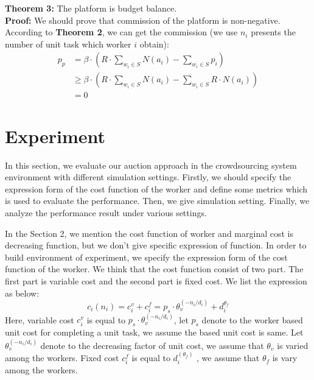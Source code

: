 \textbf{Theorem 3:} The platform is budget balance.\\
\textbf{Proof:} We should prove that commission of the platform is non-negative. According to \textbf{Theorem 2}, we can get the commission (we use $n_i$ presents the number of unit task which worker $i$ obtain):
$$
\begin{aligned}
  p_p & =    \beta \cdot \left( R \cdot \sum_{w_i \in S}N(a_i) - \sum_{w_i \in S}{p_i}\right) \\
  {}  & \geq \beta \cdot \left( R \cdot \sum_{w_i \in S}N(a_i) - \sum_{w_i \in S} R \cdot N(a_i) \right)\\
  {}  & = 0
\end{aligned}
$$
\section{Experiment}
In this section, we evaluate our auction approach in the crowdsourcing system environment with different simulation settings. Firstly, we should specify the expression form of the cost function of the worker and define some metrics which is used to evaluate the performance. Then, we give simulation setting. Finally, we analyze the performance result under various settings.

In the Section 2, we mention the cost function of worker and marginal cost is decreasing function, but we don't give specific expression of function. In order to build environment of experiment, we specify the expression form of the cost function of the worker. We think that the cost function consist of two part. The first part is variable cost and the second part is fixed cost. We list the expression as below:
\begin{equation}\label{eq11}
  c_i(n_i) = c_i^v + c_i^f = p_s \cdot \theta_v^{\left(-n_i / d_i\right)} + d_i^{\theta_f}
\end{equation}
Here, variable cost $c_i^v$ is equal to $p_s \cdot \theta_v^{(-n_i/d_i)}$, let $p_s$ denote to the worker based unit cost for completing a unit task, we assume the based unit cost is same. Let $\theta_v^{(-n_i / d_i)}$ denote to the decreasing factor of unit cost, we assume that $\theta_v$ is varied among the workers. Fixed cost $c_i^f$ is equal to $d_i^{(\theta_f)}$ , we assume that $\theta_f$ is vary among the workers.

